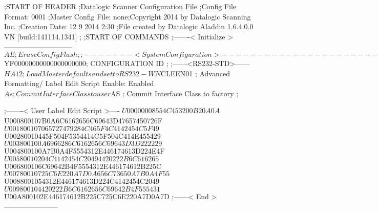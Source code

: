 ;START OF HEADER
;Datalogic Scanner Configuration File
;Config File Format: 0001
;Master Config File: none;Copyright 2014 by Datalogic Scanning Inc.
;Creation Date: 12 9 2014 2:30
;File created by Datalogic Aladdin 1.6.4.0.0 VN [build:141114.1341]
;
;START OF COMMANDS
;-------< Initialize >-----------------------------
$AE                 ; Erase Config Flash
;
;-------< System Configuration >-------------------------------
$YF00000000000000000000; CONFIGURATION ID
;
;------<RS232-STD>------
$HA12               ; Load Master defaults and set to RS232-WN
$CLEEN01            ; Advanced Formatting/ Label Edit Script Enable: Enabled
$As                 ; Commit Interface Class to user
$AS                 ; Commit Interface Class to factory
;

;-------< User Label Edit Script >----
$U00000008554C453200B20A0A
$U000800107B0A6C6162656C69643D47657450726F
$U001800107065727479284C465F4C4142454C5F49
$U00280010445F504F5354414C5F504C414E455429
$U003800100A6966286C6162656C69643D3D222229
$U004800100A7B0A4F5554312E446174613D224E4F
$U00580010204C4142454C20494420222B6C616265
$U006800106C69642B4F5554312E446174612B225C
$U00780010725C6E220A7D0A656C73650A7B0A4F55
$U0088001054312E446174613D224C4142454C2049
$U009800104420222B6C6162656C69642B4F555431
$U00A800102E446174612B225C725C6E220A7D0A7D
;------< End >-----------------------
